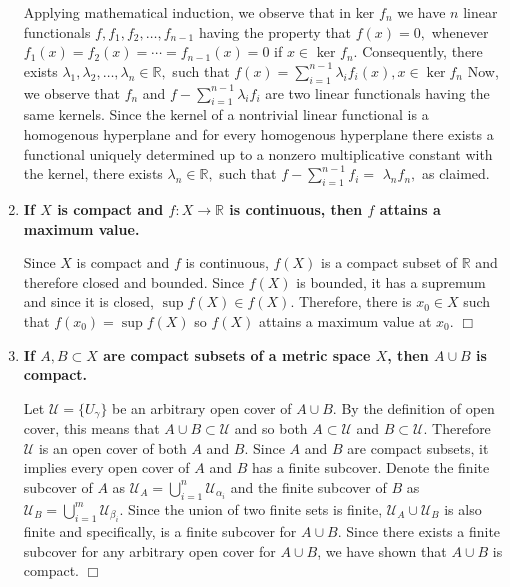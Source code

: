 \documentclass[5pt,letterpaper,reqno]{amsart}
\newcommand{\R}{\mathbb R}
\begin{document}
\begin{enumerate}[1.]
\begin{flushleft}
    Applying mathematical induction, we observe that in ker $f _ { n }$ we have $n$
linear functionals $f , f _ { 1 } , f _ { 2 } , \ldots , f _ { n - 1 }$ having the property that $f ( x ) = 0 ,$ whenever $f _ { 1 } ( x ) = f _ { 2 } ( x ) = \cdots = f _ { n - 1 } ( x ) = 0$ if $x \in$ ker $f _ { n } .$ Consequently, there exists $\lambda _ { 1 } , \lambda _ { 2 } , \ldots , \lambda _ { n } \in \mathbb { R } ,$ such that $f ( x ) = \sum _ { i = 1 } ^ { n - 1 } \lambda _ { i } f _ { i } ( x ) , x \in \operatorname { ker } f _ { n }$
Now, we observe that $f _ { n }$ and $f - \sum _ { i = 1 } ^ { n - 1 } \lambda _ { i } f _ { i }$ are two linear functionals having the same kernels. Since the kernel of a nontrivial linear functional is a homogenous hyperplane and for every homogenous hyperplane there exists a functional uniquely determined up to a nonzero multiplicative constant with the kernel, there exists $\lambda _ { n } \in \mathbb { R } ,$ such that $f - \sum _ { i = 1 } ^ { n - 1 } f _ { i } =$
$\lambda _ { n } f _ { n } ,$ as claimed.
\end{flushleft}
\item \textbf{If $X$ is compact and $f: X\rightarrow \R$ is continuous, then $f$ attains a maximum value.}
\begin{flushleft}
    Since $X$ is compact and $f$ is continuous, $f(X)$ is a compact subset of $\R$ and therefore closed and bounded. Since $f(X)$ is bounded, it has a supremum and since it is closed, $\sup f(X) \in f(X)$. Therefore, there is $x_0 \in X$ such that $f(x_0) = \sup f(X)$ so $f(X)$ attains a maximum value at $x_0$. $\Box$
\end{flushleft}
\item \textbf{If $A, B\subset X$ are compact subsets of a metric space $X$, then $A\cup B$ is compact.}
\begin{flushleft}
    Let $\mathcal{U} = \{U_\gamma\}$ be an arbitrary open cover of $A \cup B$. By the definition of open cover, this means that $A \cup B \subset \mathcal{U}$ and so both $A \subset \mathcal{U}$ and $B \subset \mathcal{U}$. Therefore $\mathcal{U}$ is an open cover of both $A$ and $B$. Since $A$ and $B$ are compact subsets, it implies every open cover of $A$ and $B$ has a finite subcover. Denote the finite subcover of $A$ as $\mathcal{U}_A = \bigcup\limits_{i=1}^n \mathcal{U}_{\alpha_i}$ and the finite subcover of $B$ as $\mathcal{U}_B = \bigcup\limits_{i=1}^m \mathcal{U}_{\beta_i}$. Since the union of two finite sets is finite, $\mathcal{U}_A \cup \mathcal{U}_B$ is also finite and specifically, is a finite subcover for $A \cup B$. Since there exists a finite subcover for any arbitrary open cover for $A \cup B$, we have shown that $A \cup B$ is compact. $\Box$
\end{flushleft}
\end{enumerate}
\newpage
\end{document}
